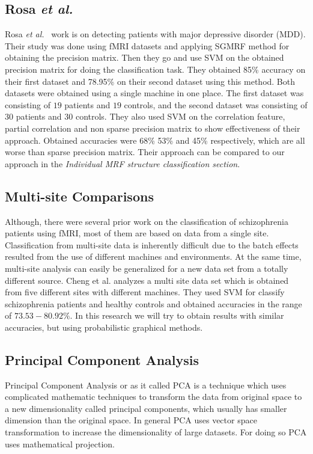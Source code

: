 \documentclass{article} %
\begin{document}
\subsection{Rosa \emph{et al.}}
Rosa \emph{et al.}~\cite{Rosa_2013} work is on detecting patients with major 
depressive disorder (MDD). Their study was done using fMRI datasets and 
applying SGMRF method for obtaining the precision matrix. Then they go and 
use SVM on the obtained precision matrix for doing the classification task. 
They obtained 85\% accuracy on their first dataset and 78.95\% on their 
second dataset using this method. Both datasets were obtained using a single 
machine in one place. The first dataset was consisting of $19$ patients 
and $19$ controls, and the second dataset was consisting of $30$ 
patients and $30$ controls. They also used SVM on the correlation feature, partial correlation and non sparse precision matrix to show effectiveness of their approach. Obtained accuracies were 68\% 53\% and 45\% respectively, which are all worse than sparse precision matrix. Their 
approach can be compared to our approach in the \textit{Individual MRF 
structure classification section}.       

\subsection{Multi-site Comparisons}
Although, there were several prior work on the classification of schizophrenia 
patients using fMRI, most of them are based on data from a single site. 
Classification from multi-site data is inherently difficult due to the batch 
effects resulted from the use of different machines and environments. At the 
same time, multi-site analysis can easily be generalized for a new data set 
from a totally different source. Cheng et al. \cite{Cheng2015} analyzes a 
multi site data set which is obtained from five different sites with different 
machines. They used SVM for classify schizophrenia patients and healthy 
controls and obtained accuracies in the range of $73.53- 80.92\%$. In this 
research we will try to obtain results with similar accuracies, but using 
probabilistic graphical methods.


\subsection{Principal Component Analysis}
Principal Component Analysis or as it called PCA is a technique which uses 
complicated mathematic techniques to transform the data from original space 
to a new dimensionality called principal components, which usually has 
smaller dimension than the original space. In general PCA uses vector 
space transformation to increase the dimensionality of large datasets. For 
doing so PCA uses mathematical projection. \cite{richardson2009principal}
\end{document}
